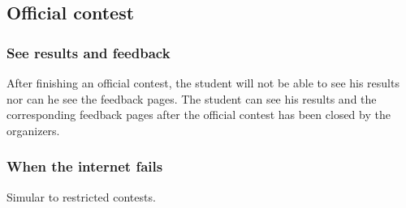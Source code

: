 \subsection{Official contest}

\subsubsection{See results and feedback}
After finishing an official contest, the student will not be able to see his results nor can he see the feedback pages. The student can see his results and the corresponding feedback pages after the official contest has been closed by the organizers. 

\subsubsection{When the internet fails}
Simular to restricted contests. 


